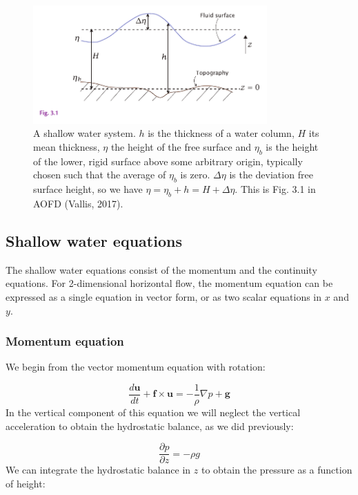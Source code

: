 \documentclass[12pt]{article}
\numberwithin{equation}{section}
\numberwithin{figure}{section}
\numberwithin{table}{section}
\begin{document}
\begin{figure}[h]
  \centering
  \includegraphics[width=0.8\textwidth]{assets/fig_shallow_water1.pdf}
  \caption{
    A shallow water system.
    $h$ is the thickness of a water column, $H$ its mean thickness, $\eta$ the
    height of the free surface and $\eta_b$ is the height of the lower, rigid
    surface above some arbitrary origin, typically chosen such that the average
    of $\eta_b$ is zero.
    $\Delta \eta$ is the deviation free surface height, so we have
    $\eta = \eta_b + h = H + \Delta \eta$.
    This is Fig. 3.1 in AOFD (Vallis, 2017).
  }
  \label{fig:shallow_water1}
\end{figure}

\subsection{Shallow water equations}

The shallow water equations consist of the momentum and the continuity
equations.
For 2-dimensional horizontal flow, the momentum equation can be expressed as
a single equation in vector form, or as two scalar equations in $x$ and $y$.

\subsubsection{Momentum equation}

We begin from the vector momentum equation with rotation:

\begin{equation}
  \frac{d \mathbf{u}}{dt} + \mathbf{f} \times \mathbf{u} =
  - \frac{1}{\rho} \nabla p + \mathbf{g}
  \label{eq:shallow_water_momentum1}
\end{equation}
In the vertical component of this equation we will neglect the vertical
acceleration to obtain the hydrostatic balance, as we did previously:

\begin{equation}
  \frac{\partial p}{\partial z} = -\rho g
\end{equation}
We can integrate the hydrostatic balance in $z$ to obtain the pressure as a
function of height:
\end{document}
